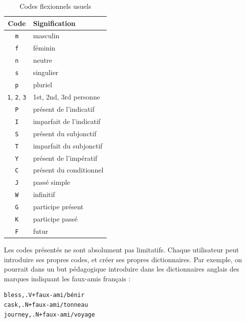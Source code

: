 \begin{table}[!h]
\begin{center}
\begin{tabular}{|c|l|}
\hline
\textbf{Code} & \textbf{Signification} \\
\hline
\verb+m+ & masculin \\
\hline
\verb+f+ & féminin \\
\hline
\verb+n+ & neutre \\
\hline
\verb+s+ & singulier \\
\hline
\verb+p+ & pluriel \\
\hline
\verb+1+, \verb+2+, \verb+3+ & 1st, 2nd, 3rd personne\\
\hline
\verb+P+ & présent de l’indicatif \\
\hline
\verb+I+ & imparfait de l’indicatif  \\
\hline
\verb+S+ & présent du subjonctif\\
\hline
\verb+T+ & imparfait du subjonctif \\
\hline
\verb+Y+ & présent de l’impératif \\
\hline
\verb+C+ & présent du conditionnel\\
\hline
\verb+J+ & passé simple \\
\hline
\verb+W+ & infinitif \\
\hline
\verb+G+ & participe présent \\
\hline
\verb+K+ & participe passé \\
\hline
\verb+F+ & futur \\
\hline
\end{tabular}
\caption{Codes flexionnels usuels\label{tab-inflectional-codes}}
\end{center}
\end{table}


\bigskip
\noindent Les codes présentés ne sont absolument pas limitatifs. Chaque utilisateur peut introduire
ses propres codes, et créer ses propres dictionnaires. Par exemple, on pourrait dans un but
pédagogique introduire dans les dictionnaires anglais des marques indiquant les faux-amis
français :

\bigskip
\begin{verbatim}
bless,.V+faux-ami/bénir
cask,.N+faux-ami/tonneau
journey,.N+faux-ami/voyage
\end{verbatim}

